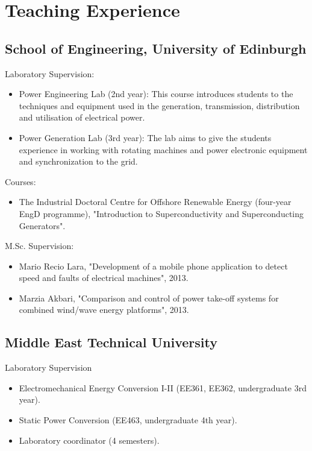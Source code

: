 \documentclass[a4paper,12pt]{article}
\begin{document}
\section{Teaching Experience}

\subsection{School of Engineering, University of Edinburgh}

Laboratory Supervision:
\begin{itemize}
\item Power Engineering Lab (2nd year): This course introduces students to the techniques and equipment used in the generation, transmission, distribution and utilisation of electrical power.
\item Power Generation Lab (3rd year): The lab aims to give the students experience in working with rotating machines and power electronic equipment and synchronization to the grid. 

\end{itemize}

Courses:
\begin{itemize}
\item The Industrial Doctoral Centre for Offshore Renewable Energy (four-year EngD programme), "Introduction to Superconductivity and Superconducting Generators".
\end{itemize}


M.Sc. Supervision:
\begin{itemize}
\item Mario Recio Lara, "Development of a mobile phone application to detect speed and faults of electrical machines", 2013.
\item Marzia Akbari, "Comparison and control of power take-off systems for combined wind/wave energy platforms", 2013.
\end{itemize}



\subsection{Middle East Technical University}
Laboratory Supervision
\begin{itemize}
\item Electromechanical Energy Conversion I-II (EE361, EE362, undergraduate 3rd year).
\item Static Power Conversion (EE463, undergraduate 4th year).
\item Laboratory coordinator (4 semesters). 
\end{itemize}
\end{document}
